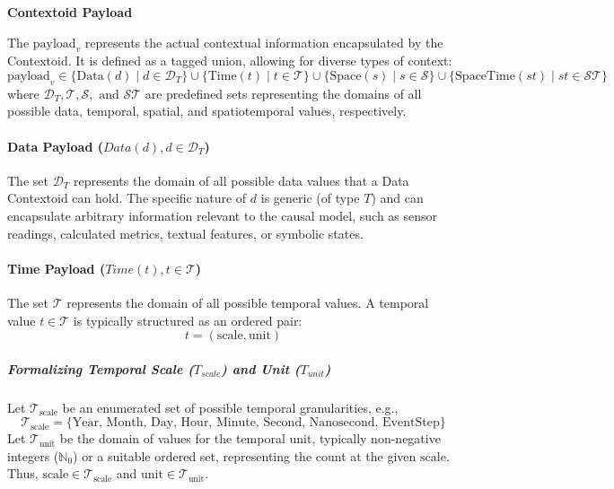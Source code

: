 \textbf{Contextoid Payload} 

The \( \text{payload}_v \) represents the actual contextual information encapsulated by the Contextoid. It is defined as a tagged union, allowing for diverse types of context:
\[ \text{payload}_v \in \{ \text{Data}(d) \mid d \in \mathcal{D}_T \} \cup \{ \text{Time}(t) \mid t \in \mathcal{T} \} \cup \{ \text{Space}(s) \mid s \in \mathcal{S} \} \cup \{ \text{SpaceTime}(st) \mid st \in \mathcal{ST} \} \]
where $\mathcal{D}_T, \mathcal{T}, \mathcal{S}, \text{ and } \mathcal{ST}$ are predefined sets representing the domains of all possible data, temporal, spatial, and spatiotemporal values, respectively.


            \paragraph[Data Payload]{Data Payload (\(Data(d), d \in \mathcal{D}_T\))}\label{par:data_payload}
            
            The set \(\mathcal{D}_T\) represents the domain of all possible data values that a Data Contextoid can hold. The specific nature of \(d\) is generic (of type \(T\)) and can encapsulate arbitrary information relevant to the causal model, such as sensor readings, calculated metrics, textual features, or symbolic states.


            \paragraph[Time Payload]{Time Payload (\(Time(t), t \in \mathcal{T}\))}\label{par:time_payload}
            
            The set \(\mathcal{T}\) represents the domain of all possible temporal values. A temporal value \(t \in \mathcal{T}\) is typically structured as an ordered pair:
            \[ t = (\text{scale}, \text{unit}) \]
            
                \subparagraph[Temporal Scale and Unit]{Formalizing Temporal Scale (\(T_{scale}\)) and Unit (\(T_{unit}\))}
                \label{subpar:temporal_scale_unit}
                
                Let \(\mathcal{T}_{\text{scale}}\) be an enumerated set of possible temporal granularities, e.g., 
                \[ \mathcal{T}_{\text{scale}} = \{\text{Year, Month, Day, Hour, Minute, Second, Nanosecond, EventStep}\} \]
                Let \(\mathcal{T}_{\text{unit}}\) be the domain of values for the temporal unit, typically non-negative integers (\(\mathbb{N}_0\)) or a suitable ordered set, representing the count at the given \(\text{scale}\).
                Thus, \(\text{scale} \in \mathcal{T}_{\text{scale}}\) and \(\text{unit} \in \mathcal{T}_{\text{unit}}\).


